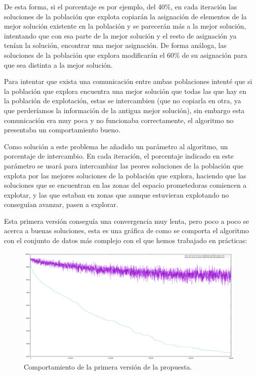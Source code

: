 \documentclass[12pt, spanish]{article}
\begin{document}
De esta forma, si el porcentaje es por ejemplo, del 40\%, en cada iteración las soluciones de la población que explota copiarán la asignación de elementos de la mejor solución existente en la población y se parecerán más a la mejor solución, intentando que con esa parte de la mejor solución y el resto de asignación ya tenían la solución, encontrar una mejor asignación. De forma análoga, las soluciones de la población que explora modificarán el 60\% de su asignación para que sea distinta a la mejor solución.

Para intentar que exista una comunicación entre ambas poblaciones intenté que si la población que explora encuentra una mejor solución que todas las que hay en la población de explotación, estas se intercambien (que no copiarla en otra, ya que perderíamos la información de la antigua mejor solución), sin embargo esta comunicación era muy poca y no funcionaba correctamente, el algoritmo no presentaba un comportamiento bueno.

Como solución a este problema he añadido un parámetro al algoritmo, un porcentaje de intercambio. En cada iteración, el porcentaje indicado en este parámetro se usará para intercambiar las peores soluciones de la población que explota por las mejores soluciones de la población que explora, haciendo que las soluciones que se encuentran en las zonas del espacio prometedoras comiencen a explotar, y las que estaban en zonas que aunque estuvieran explotando no conseguían avanzar, pasen a explorar.

Esta primera versión conseguía una convergencia muy lenta, pero poco a poco se acerca a buenas soluciones, esta es una gráfica de como se comporta el algoritmo con el conjunto de datos más complejo con el que hemos trabajado en prácticas:

\begin{figure}[H]
	\centering
	\includegraphics[scale = 0.33]{basico_sin_BL.png}
	
	\caption{Comportamiento de la primera versión de la propuesta.}
	\label{fig:basico_sin_BL}
\end{figure}
\end{document}
